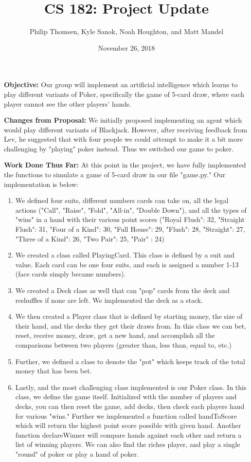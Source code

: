 \documentclass[]{article}
\title{CS 182: Project Update}
\author{Philip Thomsen, Kyle Sanok, Noah Houghton, and Matt Mandel}
\date{November 26, 2018}
\begin{document}
\maketitle

\clearpage
\textbf{Objective:} Our group will implement an artificial intelligence which learns to play different variants of Poker, specifically the game of 5-card draw, where each player cannot see the other players' hands.

\textbf{Changes from Proposal:} We initially proposed implementing an agent which would play different variants of Blackjack. However, after receiving feedback from Lev, he suggested that with four people we could attempt to make it a bit more challenging by "playing" poker instead. Thus we switched our game to poker.

\textbf{Work Done Thus Far:} At this point in the project, we have fully implemented the functions to simulate a game of 5-card draw in our file "game.py." Our implementation is below:
\begin{enumerate}
    \item We defined four suits, different numbers cards can take on, all the legal actions ("Call", "Raise", "Fold", "All-in", "Double Down"), and all the types of "wins" in a hand with their various point scores ("Royal Flush": 32, "Straight Flush": 31, "Four of a Kind": 30, "Full House": 29, "Flush": 28, "Straight": 27, "Three of a Kind": 26, "Two Pair": 25, "Pair" : 24)
    \item We created a class called PlayingCard. This class is defined by a suit and value. Each card can be one four suits, and each is assigned a number 1-13 (face cards simply became numbers).
    \item We created a Deck class as well that can "pop" cards from the deck and reshuffles if none are left. We implemented the deck as a stack.
    \item We then created a Player class that is defined by starting money, the size of their hand, and the decks they get their draws from. In this class we can bet, reset, receive money, draw, get a new hand, and accomplish all the comparisons between two players (greater than, less than, equal to, etc.)
    \item Further, we defined a class to denote the "pot" which keeps track of the total money that has been bet.
    \item Lastly, and the most challenging class implemented is our Poker class. In this class, we define the game itself. Initialized with the number of players and decks, you can then reset the game, add decks, then check each players hand for various "wins." Further we implemented a function called handToScore which will return the highest point score possible with given hand. Another function declareWinner will compare hands against each other and return a list of winning players. We can also find the riches player, and play a single "round" of poker or play a hand of poker.
\end{enumerate}
\end{document}
